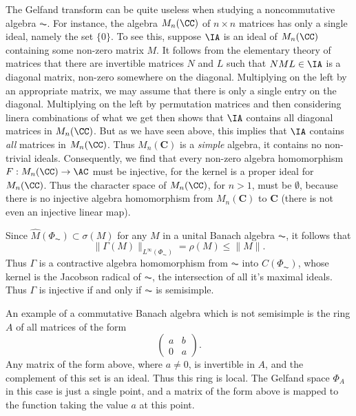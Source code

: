\begin{example}
    The Gelfand transform can be quite useless when studying a noncommutative algebra $\AC$. For instance, the algebra $M_n(\CC)$ of $n \times n$ matrices has only a single ideal, namely the set $\{ 0 \}$. To see this, suppose $\IA$ is an ideal of $M_n(\CC)$ containing some non-zero matrix $M$. It follows from the elementary theory of matrices that there are invertible matrices $N$ and $L$ such that $NML \in \IA$ is a diagonal matrix, non-zero somewhere on the diagonal. Multiplying on the left by an appropriate matrix, we may assume that there is only a single entry on the diagonal. Multiplying on the left by permutation matrices and then considering linera combinations of what we get then shows that $\IA$ contains all diagonal matrices in $M_n(\CC)$. But as we have seen above, this implies that $\IA$ contains \emph{all} matrices in $M_n(\CC)$. Thus $M_n(\mathbf{C})$ is a {\it simple} algebra, it contains no non-trivial ideals. Consequently, we find that every non-zero algebra homomorphism $F: M_n(\CC) \to \AC$ must be injective, for the kernel is a proper ideal for $M_n(\CC)$. Thus the character space of $M_n(\CC)$, for $n > 1$, must be $\emptyset$, because there is no injective algebra homomorphism from $M_n(\mathbf{C})$ to $\mathbf{C}$ (there is not even an injective linear map).
\end{example}

Since $\widehat{M}(\Phi_{\AC}) \subset \sigma(M)$ for any $M$ in a unital Banach algebra $\AC$, it follows that
%
\[ \| \Gamma(M) \|_{L^\infty(\Phi_{\AC})} = \rho(M) \leq \| M \|. \]
%
Thus $\Gamma$ is a contractive algebra homomorphism from $\AC$ into $C(\Phi_{\AC})$, whose kernel is the Jacobson radical of $\AC$, the intersection of all it's maximal ideals. Thus $\Gamma$ is injective if and only if $\AC$ is semisimple.

\begin{example}
    An example of a commutative Banach algebra which is not semisimple is the ring $A$ of all matrices of the form
    \[ \begin{pmatrix} a & b \\ 0 & a \end{pmatrix}. \]
    Any matrix of the form above, where $a \neq 0$, is invertible in $A$, and the complement of this set is an ideal. Thus this ring is local. The Gelfand space $\Phi_A$ in this case is just a single point, and a matrix of the form above is mapped to the function taking the value $a$ at this point.
\end{example}

